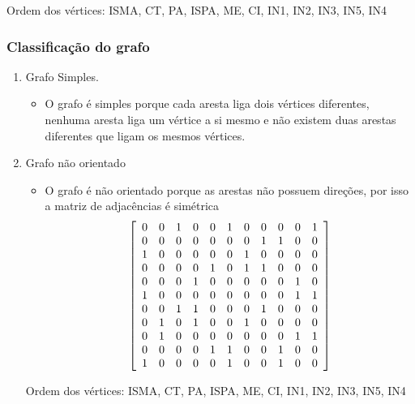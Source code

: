 \documentclass[12pt]{article}
\begin{document}
    \noindent Ordem dos vértices: ISMA, CT, PA, ISPA, ME, CI, IN1, IN2, IN3, IN5, IN4\\
    
    \subsubsection{Classificação do grafo}
    
    \begin{enumerate}
      \item Grafo Simples.
        \begin{itemize}
          \item O grafo é simples porque cada aresta liga dois vértices diferentes,
                nenhuma aresta liga um vértice a si mesmo e
                não existem duas arestas diferentes que ligam os mesmos vértices.
        \end{itemize}
      
      \item Grafo não orientado
          \begin{itemize}
              \item O grafo é não orientado porque as arestas não possuem direções, por isso a matriz de adjacências é simétrica\\
              
            $$
            \left[
                \begin{array}{*{11}c}
                    0 & 0 & 1 & 0 & 0 & 1 & 0 & 0 & 0 & 0 & 1\\ 
                    0 & 0 & 0 & 0 & 0 & 0 & 0 & 1 & 1 & 0 & 0\\ 
                    1 & 0 & 0 & 0 & 0 & 0 & 1 & 0 & 0 & 0 & 0\\ 
                    0 & 0 & 0 & 0 & 1 & 0 & 1 & 1 & 0 & 0 & 0\\ 
                    0 & 0 & 0 & 1 & 0 & 0 & 0 & 0 & 0 & 1 & 0\\ 
                    1 & 0 & 0 & 0 & 0 & 0 & 0 & 0 & 0 & 1 & 1\\ 
                    0 & 0 & 1 & 1 & 0 & 0 & 0 & 1 & 0 & 0 & 0\\ 
                    0 & 1 & 0 & 1 & 0 & 0 & 1 & 0 & 0 & 0 & 0\\ 
                    0 & 1 & 0 & 0 & 0 & 0 & 0 & 0 & 0 & 1 & 1\\ 
                    0 & 0 & 0 & 0 & 1 & 1 & 0 & 0 & 1 & 0 & 0\\ 
                    1 & 0 & 0 & 0 & 0 & 1 & 0 & 0 & 1 & 0 & 0 
                \end{array}
                \right]
            $$ 
            \end{itemize}
    Ordem dos vértices: ISMA, CT, PA, ISPA, ME, CI, IN1, IN2, IN3, IN5, IN4\\
            

\end{enumerate}
\end{document}
